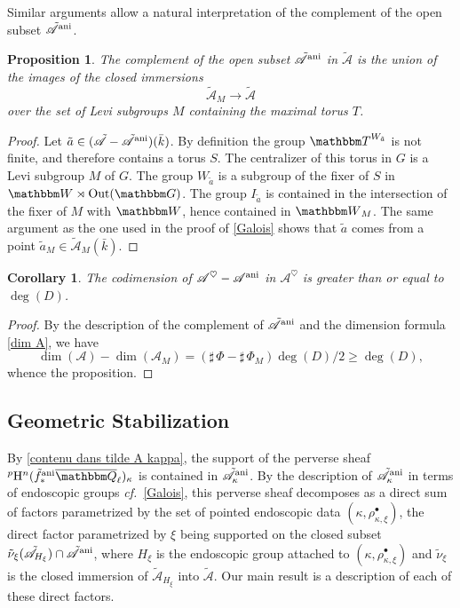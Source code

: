 \documentclass[12pt,english]{smfart}
\numberwithin{equation}{subsection}
\newtheorem{proposition}[equation]{Proposition}
\newtheorem{corollary}[equation]{Corollary}
\theoremstyle{remark}
\newcommand\calA{{\mathscr A}}
\newcommand\GG{{\mathbbm G}}
\newcommand\QQ{{\mathbbm Q}}
\newcommand\bbW{{\mathbbm W}}
\newcommand\bbT{{\mathbbm T}}
\newcommand\rmH{{\rm H}}
\newcommand\Out{{\rm Out}}
\newcommand\cf{{\it cf.\ }}
\newcommand\ani{{\rm ani}}
\newcommand\Ql{{\overline\QQ_\ell}}
\begin{document}
Similar arguments allow a natural interpretation of the complement of the open subset $\tilde\calA^\ani$.

\begin{proposition}\label{complement de A ani}
The complement of the open subset $\tilde\calA^\ani$ in $\tilde\calA$ is the union of the images of the closed immersions
$$\tilde\calA_M\rightarrow\tilde\calA$$
over the set of Levi subgroups $M$ containing the maximal torus $T$.
\end{proposition}

\begin{proof}
Let $\tilde a\in(\tilde\calA-\tilde\calA^\ani)(\bar k)$. By definition the group $\bbT^{W_{\tilde a}}$ is not finite, and therefore contains a torus $S$. The centralizer of this torus in $G$ is a Levi subgroup $M$ of $G$. The group $W_{\tilde a}$ is a subgroup of the fixer of $S$ in $\bbW\rtimes\Out(\GG)$. The group $I_{\tilde a}$ is contained in the intersection of the fixer of $M$ with $\bbW$, hence contained in $\bbW_M$. The same argument as the one used in the proof of \ref{Galois} shows that $\tilde a$ comes from a point $\tilde a_M\in\tilde\calA_M(\bar k)$.
\end{proof}

\begin{corollary}\label{codim complement de A ani}
The codimension of $\calA^\heartsuit-\calA^\ani$ in $\calA^\heartsuit$ is greater than or equal to $\deg(D)$.
\end{corollary}

\begin{proof}
By the description of the complement of $\tilde\calA^\ani$ and the dimension formula \ref{dim A}, we have
$$\dim(\calA)-\dim(\calA_M)=(\sharp\,\Phi-\sharp\,\Phi_M)\deg(D)/2\geq \deg(D),$$
whence the proposition.
\end{proof}

\subsection{Geometric Stabilization}
\label{subsection : stabilisation sur tilde A}

By \ref{contenu dans tilde A kappa}, the support of the perverse sheaf ${}^p\rmH^n(\tilde f^\ani_*\Ql)_\kappa$ is contained in $\tilde\calA_\kappa^\ani$. By the description of $\tilde\calA_\kappa^\ani$ in terms of endoscopic groups \cf \ref{Galois}, this perverse sheaf decomposes as a direct sum of factors parametrized by the set of pointed endoscopic data $(\kappa,\rho^\bullet_{\kappa,\xi})$, the direct factor parametrized by $\xi$ being supported on the closed subset $\tilde\nu_\xi(\tilde\calA_{H_\xi})\cap\tilde\calA^\ani$, where $H_\xi$ is the endoscopic group attached to $(\kappa,\rho^\bullet_{\kappa,\xi})$ and $\tilde\nu_\xi$ is the closed immersion of $\tilde\calA_{H_\xi}$ into $\tilde\calA$. Our main result is a description of each of these direct factors.
\end{document}
